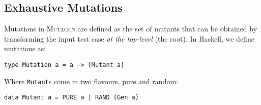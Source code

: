 \documentclass[sigconf, anonymous, review]{acmart}
\newcommand{\fuzzchick}{\textit{FuzzChick}\xspace}
\newcommand{\mutagen}{\textsc{Mutagen}\xspace}
\begin{document}


\subsection{Exhaustive Mutations}


Mutations in \mutagen are defined as the set of mutants that can be obtained by
transforming the input test case \emph{at the top-level} (the root).
%
In Haskell, we define mutations as:

\begin{verbatim}
type Mutation a = a -> [Mutant a]
\end{verbatim}

\noindent Where \texttt{Mutant}s come in two flavours, pure and random:

\begin{verbatim}
data Mutant a = PURE a | RAND (Gen a)
\end{verbatim}
\end{document}
